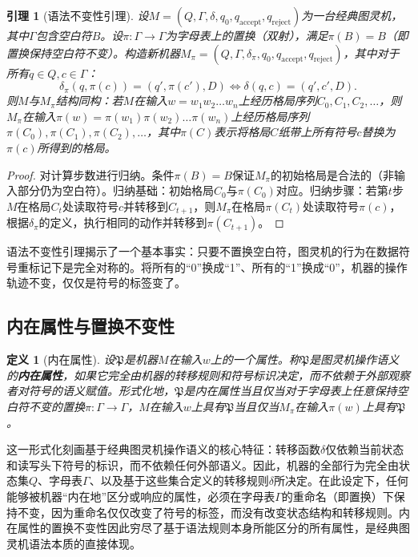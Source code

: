 \documentclass{ctexart}
\newtheorem{lemma}[theorem]{引理}
\newtheorem{definition}[theorem]{定义}
\newtheorem{proof}[theorem]{证明}
\begin{document}
	\begin{lemma}[语法不变性引理]\label{lem:syntactic-invariance}
		设$M = (Q, \Gamma, \delta, q_0, q_{\text{accept}}, q_{\text{reject}})$为一台经典图灵机，其中$\Gamma$包含空白符$B$。设$\pi: \Gamma \to \Gamma$为字母表上的置换（双射），满足$\pi(B) = B$（即置换保持空白符不变）。构造新机器$M_\pi = (Q, \Gamma, \delta_\pi, q_0, q_{\text{accept}}, q_{\text{reject}})$，其中对于所有$q \in Q, c \in \Gamma$：
		\[
		\delta_\pi(q, \pi(c)) = (q', \pi(c'), D) \iff \delta(q, c) = (q', c', D).
		\]
		则$M$与$M_\pi$结构同构：若$M$在输入$w = w_1 w_2 \ldots w_n$上经历格局序列$C_0, C_1, C_2, \ldots$，则$M_\pi$在输入$\pi(w) = \pi(w_1) \pi(w_2) \ldots \pi(w_n)$上经历格局序列$\pi(C_0), \pi(C_1), \pi(C_2), \ldots$，其中$\pi(C)$表示将格局$C$纸带上所有符号$c$替换为$\pi(c)$所得到的格局。
	\end{lemma}
	\begin{proof}
		对计算步数进行归纳。条件$\pi(B)=B$保证$M_\pi$的初始格局是合法的（非输入部分仍为空白符）。归纳基础：初始格局$C_0$与$\pi(C_0)$对应。归纳步骤：若第$t$步$M$在格局$C_t$处读取符号$c$并转移到$C_{t+1}$，则$M_\pi$在格局$\pi(C_t)$处读取符号$\pi(c)$，根据$\delta_\pi$的定义，执行相同的动作并转移到$\pi(C_{t+1})$。
	\end{proof}
	
	语法不变性引理揭示了一个基本事实：只要不置换空白符，图灵机的行为在数据符号重标记下是完全对称的。将所有的``0''换成``1''、所有的``1''换成``0''，机器的操作轨迹不变，仅仅是符号的标签变了。
	
	\subsection{内在属性与置换不变性}
	
	\begin{definition}[内在属性]
		设$\mathfrak{P}$是机器$M$在输入$w$上的一个属性。称$\mathfrak{P}$是图灵机操作语义的\textbf{内在属性}，如果它完全由机器的转移规则和符号标识决定，而不依赖于外部观察者对符号的语义赋值。形式化地，$\mathfrak{P}$是内在属性当且仅当对于字母表上任意保持空白符不变的置换$\pi: \Gamma \to \Gamma$，$M$在输入$w$上具有$\mathfrak{P}$当且仅当$M_\pi$在输入$\pi(w)$上具有$\mathfrak{P}$。
	\end{definition}
	
	这一形式化刻画基于经典图灵机操作语义的核心特征：转移函数$\delta$仅依赖当前状态和读写头下符号的标识，而不依赖任何外部语义。因此，机器的全部行为完全由状态集$Q$、字母表$\Gamma$、以及基于这些集合定义的转移规则$\delta$所决定。在此设定下，任何能够被机器``内在地''区分或响应的属性，必须在字母表$\Gamma$的重命名（即置换）下保持不变，因为重命名仅仅改变了符号的标签，而没有改变状态结构和转移规则。内在属性的置换不变性因此穷尽了基于语法规则本身所能区分的所有属性，是经典图灵机语法本质的直接体现。
	
\end{document}
